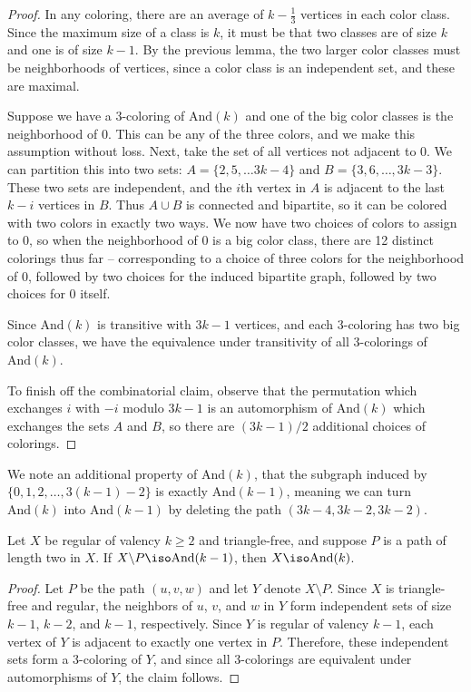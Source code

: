\begin{proof}
	In any coloring, there are an average of $k-\tfrac{1}{3}$ vertices in each color class.  Since the maximum size of a class is $k$, it must be that two classes are of size $k$ and one is of size $k-1$.  By the previous lemma, the two larger color classes must be neighborhoods of vertices, since a color class is an independent set, and these are maximal.
	
	Suppose we have a 3-coloring of $\mathrm{And}(k)$ and one of the big color classes is the neighborhood of 0.  This can be any of the three colors, and we make this assumption without loss.  Next, take the set of all vertices not adjacent to 0.  We can partition this into two sets: $A=\{2,5,\dots 3k-4  \}$ and $B=\{ 3,6,\dots, 3k-3 \}$.  These two sets are independent, and the $i$th vertex in $A$ is adjacent to the last $k-i$ vertices in $B$.  Thus $A\cup B$ is connected and bipartite, so it can be colored with two colors in exactly two ways.  We now have two choices of colors to assign to 0, so when the neighborhood of 0 is a big color class, there are 12 distinct colorings thus far -- corresponding to a choice of three colors for the neighborhood of 0, followed by two choices for the induced bipartite graph, followed by two choices for 0 itself.
	
	Since $\mathrm{And}(k)$ is transitive with $3k-1$ vertices, and each 3-coloring has two big color classes, we have the equivalence under transitivity of all 3-colorings of $\mathrm{And}(k)$.
	
	To finish off the combinatorial claim, observe that the permutation which exchanges $i$ with $-i$ modulo $3k-1$ is an automorphism of $\mathrm{And}(k)$ which exchanges the sets $A$ and $B$, so there are $(3k-1)/2$ additional choices of colorings.
\end{proof}

We note an additional property of $\mathrm{And}(k)$, that the subgraph induced by $\{ 0,1,2,\dots, 3(k-1)-2  \}$ is exactly $\mathrm{And}(k-1)$, meaning we can turn $\mathrm{And}(k)$ into $\mathrm{And}(k-1)$ by deleting the path $(3k-4,3k-2,3k-2)$.

\begin{lemma}
	Let $X$ be regular of valency $k\geq 2$ and triangle-free, and suppose $P$ is a path of length two in $X$.  If $X{\setminus}P \iso\mathrm{And}(k-1)$, then $X\iso \mathrm{And}(k)$.
\end{lemma}

\begin{proof}
	Let $P$ be the path $(u,v,w)$ and let $Y$ denote $X{\setminus}P$.  Since $X$ is triangle-free and regular, the neighbors of $u$, $v$, and $w$ in $Y$ form independent sets of size $k-1$, $k-2$, and $k-1$, respectively.  Since $Y$ is regular of valency $k-1$, each vertex of $Y$ is adjacent to exactly one vertex in $P$.  Therefore, these independent sets form a 3-coloring of $Y$, and since all 3-colorings are equivalent under automorphisms of $Y$, the claim follows.
\end{proof}


